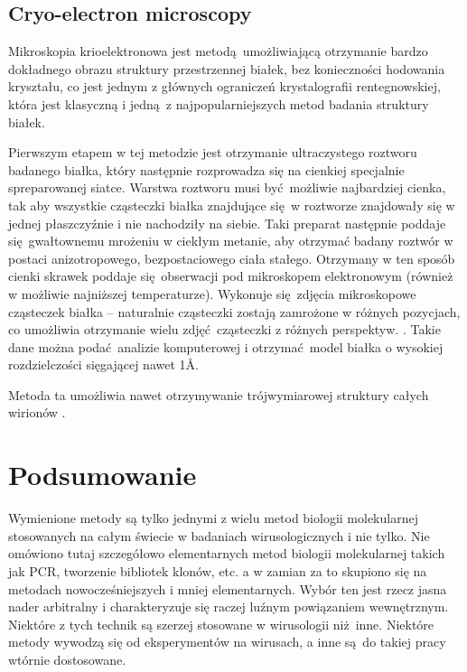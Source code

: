 \documentclass[two column, twoside, a4paper]{article}
\begin{document}
\subsection{Cryo-electron microscopy}

Mikroskopia krioelektronowa jest metodą umożliwiającą otrzymanie bardzo dokładnego obrazu struktury przestrzennej białek, bez konieczności hodowania kryształu, co jest jednym z głównych ograniczeń krystalografii rentegnowskiej, która jest klasyczną i jedną z najpopularniejszych metod badania struktury białek.

Pierwszym etapem w tej metodzie jest otrzymanie ultraczystego roztworu badanego białka, który następnie rozprowadza się na cienkiej specjalnie spreparowanej siatce. Warstwa roztworu musi być możliwie najbardziej cienka, tak aby wszystkie cząsteczki białka znajdujące się w roztworze znajdowały się w jednej płaszczyźnie i nie nachodziły na siebie. Taki preparat następnie poddaje się gwałtownemu mrożeniu w ciekłym metanie, aby otrzymać badany roztwór w postaci anizotropowego, bezpostaciowego ciała stałego. Otrzymany w ten sposób cienki skrawek poddaje się obserwacji pod mikroskopem elektronowym (również w możliwie najniższej temperaturze). Wykonuje się zdjęcia mikroskopowe cząsteczek białka -- naturalnie cząsteczki zostają zamrożone w różnych pozycjach, co umożliwia otrzymanie wielu zdjęć cząsteczki z różnych perspektyw. \autocite{Baldwin1988}. Takie dane można podać analizie komputerowej i otrzymać model białka o wysokiej rozdzielczości sięgającej nawet 1\r{A}.

Metoda ta umożliwia nawet otrzymywanie trójwymiarowej struktury całych wirionów \autocite{Adrian1984}.

\section{Podsumowanie}

Wymienione metody są tylko jednymi z wielu metod biologii molekularnej stosowanych na całym świecie w badaniach wirusologicznych i nie tylko. Nie omówiono tutaj szczegółowo elementarnych metod biologii molekularnej takich jak PCR, tworzenie bibliotek klonów, etc. a w zamian za to skupiono się na metodach nowocześniejszych i mniej elementarnych. Wybór ten jest rzecz jasna nader arbitralny i charakteryzuje się raczej luźnym powiązaniem wewnętrznym. Niektóre z tych technik są szerzej stosowane w wirusologii niż inne. Niektóre metody wywodzą się od eksperymentów na wirusach, a inne są do takiej pracy wtórnie dostosowane.
\end{document}
